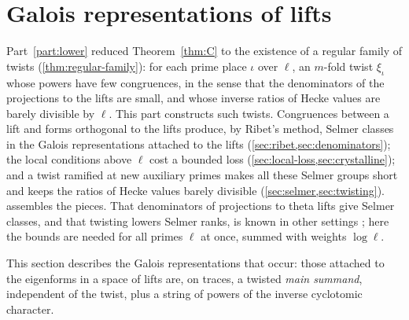 \section{Galois representations of lifts}\label{sec:galois-lifts}

Part~\ref{part:lower} reduced Theorem~\ref{thm:C} to the existence of a regular family of twists (\cref{thm:regular-family}): for each prime place $\iota$ over $\ell$, an $m$-fold twist
$\xi_\iota$ whose powers have few congruences, in the sense that the denominators of the projections to the lifts are small, and whose inverse ratios of Hecke values are
barely divisible by $\ell$. This part constructs such twists. Congruences between a lift and forms orthogonal to the lifts produce, by Ribet's method, Selmer classes
in the Galois representations attached to the lifts (\cref{sec:ribet,sec:denominators}); the local conditions above $\ell$ cost a bounded loss
(\cref{sec:local-loss,sec:crystalline}); and a twist ramified at new auxiliary primes makes all these Selmer groups short and keeps the ratios of Hecke values
barely divisible (\cref{sec:selmer,sec:twisting}).  assembles the pieces. That denominators of projections to theta lifts give Selmer classes, and that twisting lowers Selmer ranks, is known in other settings \cite{Prasanna2006,Klosin2009,MazurRubin2010}; here the bounds are needed for all primes $\ell$ at once, summed with weights $\log\ell$.

This section describes the Galois representations that occur: those attached to the eigenforms in a space of lifts are, on traces, a twisted \emph{main summand},
independent of the twist, plus a string of powers of the inverse cyclotomic character.

